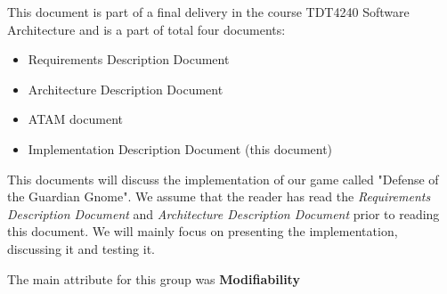 This document is part of a final delivery in the course TDT4240 Software Architecture and is a part of total four documents:

\begin{itemize}
	\item Requirements Description Document
	\item Architecture Description Document
	\item ATAM document
	\item Implementation Description Document (this document)
\end{itemize}

This documents will discuss the implementation of our game called "Defense of the Guardian Gnome". We assume that the reader has read the \emph{Requirements Description Document} and \emph{Architecture Description Document} prior to reading this document. We will mainly focus on presenting the implementation, discussing it and testing it. 

The main attribute for this group was \textbf{Modifiability}
